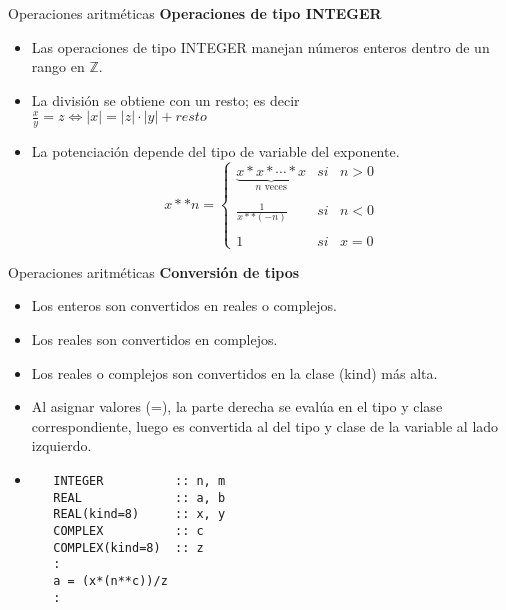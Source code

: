 \begin{frame}[fragile]{Operaciones aritméticas}
\textbf{Operaciones de tipo INTEGER}
 \begin{itemize}[<+(1)->]
  \item Las operaciones de tipo INTEGER manejan números enteros dentro de un rango en $\mathbb{Z}$.
  \item La división se obtiene con un resto; es decir\\
  \centering $\frac{x}{y} = z \Longleftrightarrow  |x| = |z| \cdot |y| + resto $
  \item La potenciación depende del tipo de variable del exponente. 
  $$
  x**n = \left\{ \begin{array}{lcc}
             \underbrace{x \ast x \ast \cdots \ast x}_\text{$n$ veces} &   si  & n > 0 \\
             \\ \frac{1}{x \ast \ast (-n)} &  si & n < 0 \\
             \\ 1 &  si  & x = 0 
             \end{array}
   \right.
  $$
 \end{itemize}
\end{frame}

\begin{frame}[fragile]{Operaciones aritméticas}
\textbf{Conversión de tipos}
 \begin{itemize}[<+(1)->]
  \item Los enteros son convertidos en reales o complejos.
  \item Los reales son convertidos en complejos.
  \item Los reales o complejos son convertidos en la clase (kind) más alta.
  \item Al asignar valores (=), la parte derecha se evalúa en el tipo y clase correspondiente, luego es convertida al del tipo y clase de la variable al lado izquierdo.
  \vspace{0.2cm}
  \item[]
  \begin{verbatim}
   INTEGER          :: n, m 
   REAL             :: a, b
   REAL(kind=8)     :: x, y
   COMPLEX          :: c
   COMPLEX(kind=8)  :: z
   :
   a = (x*(n**c))/z
   :
   \end{verbatim}
 \end{itemize}
\end{frame}


